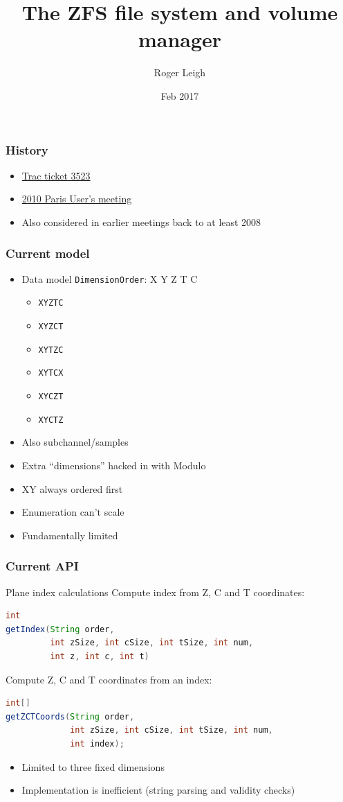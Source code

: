 \documentclass{beamer}
\title{The ZFS file system and volume manager}
\author{Roger Leigh}
\date{Feb 2017}
\begin{document}
\begin{frame}
  \titlepage
\end{frame}

\begin{frame}
  \frametitle{History}
  \begin{itemize}
  \item \href{https://trac.openmicroscopy.org/ome/ticket/3523}{Trac ticket 3523}
  \item \href{http://www.openmicroscopy.org/site/community/minutes/meetings/june-2010-paris-users-meeting/meeting-notes}{2010 Paris User's meeting}
  \item Also considered in earlier meetings back to at least 2008
  \end{itemize}
\end{frame}

\begin{frame}
  \frametitle{Current model}
  \begin{itemize}
  \item Data model \texttt{DimensionOrder}: X Y Z T C
    \begin{itemize}
      \item \texttt{XYZTC}
      \item \texttt{XYZCT}
      \item \texttt{XYTZC}
      \item \texttt{XYTCX}
      \item \texttt{XYCZT}
      \item \texttt{XYCTZ}
    \end{itemize}
    \pause
  \item Also subchannel/samples
  \item Extra ``dimensions'' hacked in with Modulo
  \item XY always ordered first
  \item Enumeration can't scale
  \item Fundamentally limited
  \end{itemize}
\end{frame}

\begin{frame}[fragile]
  \frametitle{Current API}
  \begin{block}{Plane index calculations}
    Compute index from Z, C and T coordinates:
  \begin{lstlisting}[language=Java]
int
getIndex(String order,
         int zSize, int cSize, int tSize, int num,
         int z, int c, int t)
  \end{lstlisting}
  Compute Z, C and T coordinates from an index:
  \begin{lstlisting}[language=Java]
int[]
getZCTCoords(String order,
             int zSize, int cSize, int tSize, int num,
             int index);
  \end{lstlisting}
  \begin{itemize}
  \item Limited to three fixed dimensions
  \item Implementation is inefficient (string parsing and validity checks)
  \end{itemize}
  \end{block}
\end{frame}
\end{document}
